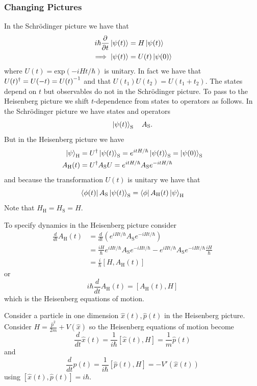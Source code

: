 \documentclass{article}
\begin{document}
\subsubsection{Changing Pictures}
In the Schr\"odinger picture we have that
\begin{align*}
	i\hbar \frac{\partial}{\partial t} \ket{\psi(t)} &= H \ket{\psi(t)}\\ 
	\implies \ket{\psi(t)} &= U(t) \ket{\psi(0)}
\end{align*}
where $ U(t) = \mathrm{exp}(-iHt/\hbar) $ is unitary. In fact we have that $ U(t)^\dagger = U(-t) = {U(t)}^{-1} $ and that $ U(t_1)U(t_2) = U(t_1 + t_2) $. The states depend on $ t $ but observables do not in the Schr\"odinger picture. To pass to the Heisenberg picture we shift $ t $-dependence from states to operators as follows. In the Schr\"odinger picture we have states and operators
\[
	\ket{\psi(t)}_{\mathrm S} \quad A_{\mathrm S}.
\]
But in the Heisenberg picture we have 
\begin{align*}
	\ket{\psi}_{\mathrm H} &= U^\dagger \ket{\psi(t)}_\mathrm{S} = e^{itH/\hbar} \ket{\psi(t)}_{\mathrm{S}} = \ket{\psi(0)}_{\mathrm S} \\
	A_{\mathrm H}(t) &= U^\dagger A_{\mathrm S} U = e^{itH/\hbar}A_{\mathrm S} e^{-itH/\hbar}
\end{align*}
and because the transformation $ U(t) $ is unitary we have that
\[
	\bra{\phi(t)} A_{\mathrm S} \ket{\psi(t)}_{\mathrm S} = \bra{\phi}A_{\mathrm H}(t)\ket{\psi}_{\mathrm H}
\]
Note that $ H_{\mathrm H} = H_{\mathrm S} = H $.\par
To specify dynamics in the Heisenberg picture consider
\begin{align*}
	\frac d{dt} A_{\mathrm H} (t) &= \frac d{dt} \left(e^{iHt/\hbar} A_{\mathrm S} e^{-iHt/\hbar}\right) \\
				      &= \frac{iH}\hbar e^{iHt/\hbar} A_{\mathrm S} e^{-iHt/\hbar} - e^{iHt/\hbar}A_{\mathrm S} e^{-iHt/\hbar} \frac{iH}\hbar \\
				      &= \frac i\hbar [H,A_{\mathrm H}(t)] 
\end{align*}
or
\[
	i\hbar \frac{d}{dt}A_{\mathrm H} (t) = [A_{\mathrm H}(t), H]
\]
which is the Heisenberg equations of motion.
\begin{example}
	Consider a particle in one dimension $ \hat x(t), \hat p(t) $ in the Heisenberg picture. Consider $ H = \frac{\hat p^2}{2m} + V(\hat x) $ so the Heisenberg equations of motion become
	\[
		\frac {d}{dt} \hat x(t) = \frac 1{i\hbar} [\hat x(t), H] = \frac 1 m \hat p(t)
	\]
	and
	\[
		\frac {d}{dt} \hat p(t) = \frac 1{i\hbar} [\hat p(t), H] = -V' (\hat x(t))
	\]
	using $ [\hat x(t),\hat p(t)] = i\hbar $.
\end{example}
\end{document}
